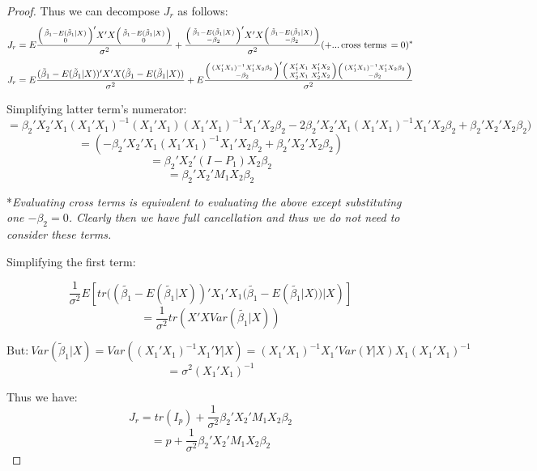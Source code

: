 \documentclass[DIV=14,titlepage=false]{scrreprt}
\begin{document}
\begin{proof}
Thus we can decompose \(J_r\) as follows:
\[J_r = E\frac{\begin{psmallmatrix}\tilde{\beta}_1-E(\tilde{\beta}_1|X)\\0\end{psmallmatrix}'X'X\begin{psmallmatrix}\tilde{\beta}_1-E(\tilde{\beta}_1|X)\\0\end{psmallmatrix}}{\sigma^2} + \frac{\begin{psmallmatrix} \tilde{\beta}_1-E(\tilde{\beta}_1|X) \\ -\beta_2 \end{psmallmatrix}'X'X\begin{psmallmatrix} \tilde{\beta}_1-E(\tilde{\beta}_1|X) \\ -\beta_2 \end{psmallmatrix}}{\sigma^2} (+... \, \text{cross terms} \, =0)^*\]
\[J_r = E\frac{(\tilde{\beta}_1-E(\tilde{\beta}_1|X))'X'X(\tilde{\beta}_1-E(\tilde{\beta}_1|X))}{\sigma^2} + E\frac{\begin{psmallmatrix} (X_1'X_1)^{-1}X_1'X_2\beta_2 \\ -\beta_2 \end{psmallmatrix}'\begin{psmallmatrix}X_1'X_1&X_1'X_2\\X_2'X_1&X_2'X_2\end{psmallmatrix}\begin{psmallmatrix} (X_1'X_1)^{-1}X_1'X_2\beta_2 \\ -\beta_2 \end{psmallmatrix}}{\sigma^2}\]

Simplifying latter term's numerator:
\[=\beta_2'X_2'X_1(X_1'X_1)^{-1}(X_1'X_1)(X_1'X_1)^{-1}X_1'X_2\beta_2-2\beta_2'X_2'X_1(X_1'X_1)^{-1}X_1'X_2\beta_2+\beta_2'X_2'X_2\beta_2)\]
\[=(-\beta_2'X_2'X_1(X_1'X_1)^{-1}X_1'X_2\beta_2+\beta_2'X_2'X_2\beta_2)\]
\[=\beta_2'X_2'(I-P_1)X_2\beta_2\]
\[=\beta_2'X_2'M_1X_2\beta_2\]

*\textit{Evaluating cross terms is equivalent to evaluating the above except substituting one \(-\beta_2=0\). Clearly then we have full cancellation and thus we do not need to consider these terms.}

Simplifying the first term:

\[\frac{1}{\sigma^2}E[tr((\tilde{\beta_1}-E(\tilde{\beta_1}|X))'X_1'X_1(\tilde{\beta_1}-E(\tilde{\beta_1}|X))|X)]\]
\[=\frac{1}{\sigma^2}tr(X'XVar(\tilde{\beta_1}|X))\]

\[\text{But:} \: Var(\tilde{\beta}_1|X)=Var((X_1'X_1)^{-1}X_1'Y|X)=(X_1'X_1)^{-1}X_1'Var(Y|X)X_1(X_1'X_1)^{-1}\]
\[=\sigma^2(X_1'X_1)^{-1}\]

Thus we have:
\[J_r = tr(I_{p}) + \frac{1}{\sigma^2}\beta_2'X_2'M_1X_2\beta_2\]
\[=p+\frac{1}{\sigma^2}\beta_2'X_2'M_1X_2\beta_2\]
\end{proof}
\end{document}

